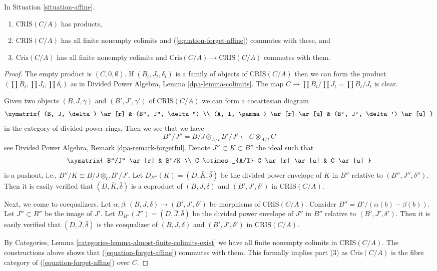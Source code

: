 \begin{lemma}
\label{lemma-affine-thickenings-colimits}
In Situation \ref{situation-affine}.
\begin{enumerate}
\item $\text{CRIS}(C/A)$ has products,
\item $\text{CRIS}(C/A)$ has all finite nonempty colimits and
(\ref{equation-forget-affine}) commutes with these, and
\item $\text{Cris}(C/A)$ has all finite nonempty colimits and
$\text{Cris}(C/A) \to \text{CRIS}(C/A)$ commutes with them.
\end{enumerate}
\end{lemma}

\begin{proof}
The empty product is $(C, 0, \emptyset)$. If $(B_t, J_t, \delta_t)$ is a
family of objects of $\text{CRIS}(C/A)$ then we can form the product
$(\prod B_t, \prod J_t, \prod \delta_t)$ as in
Divided Power Algebra, Lemma \ref{dpa-lemma-colimits}.
The map $C \to \prod B_t/\prod J_t = \prod B_t/J_t$ is clear.

\medskip\noindent
Given two objects $(B, J, \gamma)$ and $(B', J', \gamma')$ of
$\text{CRIS}(C/A)$ we can form a cocartesian diagram
$$
\xymatrix{
(B, J, \delta) \ar[r] & (B'', J'', \delta'') \\
(A, I, \gamma) \ar[r] \ar[u] & (B', J', \delta') \ar[u]
}
$$
in the category of divided power rings. Then we see that we have
$$
B''/J'' = B/J \otimes_{A/I} B'/J' \longleftarrow C \otimes_{A/I} C
$$
see Divided Power Algebra, Remark \ref{dpa-remark-forgetful}.
Denote $J'' \subset K \subset B''$
the ideal such that
$$
\xymatrix{
B''/J'' \ar[r] & B''/K \\
C \otimes_{A/I} C \ar[r] \ar[u] & C \ar[u]
}
$$
is a pushout, i.e., $B''/K \cong B/J \otimes_C B'/J'$.
Let $D_{B''}(K) = (D, \bar K, \bar \delta)$
be the divided power envelope of $K$ in $B''$ relative to
$(B'', J'', \delta'')$. Then it is easily verified that
$(D, \bar K, \bar \delta)$ is a coproduct of $(B, J, \delta)$ and
$(B', J', \delta')$ in $\text{CRIS}(C/A)$.

\medskip\noindent
Next, we come to coequalizers. Let
$\alpha, \beta : (B, J, \delta) \to (B', J', \delta')$ be morphisms of
$\text{CRIS}(C/A)$. Consider $B'' = B'/ (\alpha(b) - \beta(b))$. Let
$J'' \subset B''$ be the image of $J'$. Let
$D_{B''}(J'') = (D, \bar J, \bar\delta)$ be the divided power envelope of
$J''$ in $B''$ relative to $(B', J', \delta')$. Then it is easily verified
that $(D, \bar J, \bar \delta)$ is the coequalizer of $(B, J, \delta)$ and
$(B', J', \delta')$ in $\text{CRIS}(C/A)$.

\medskip\noindent
By Categories, Lemma \ref{categories-lemma-almost-finite-colimits-exist}
we have all finite nonempty colimits in $\text{CRIS}(C/A)$. The constructions
above shows that (\ref{equation-forget-affine}) commutes with them.
This formally implies part (3) as $\text{Cris}(C/A)$ is the fibre category
of (\ref{equation-forget-affine}) over $C$.
\end{proof}

